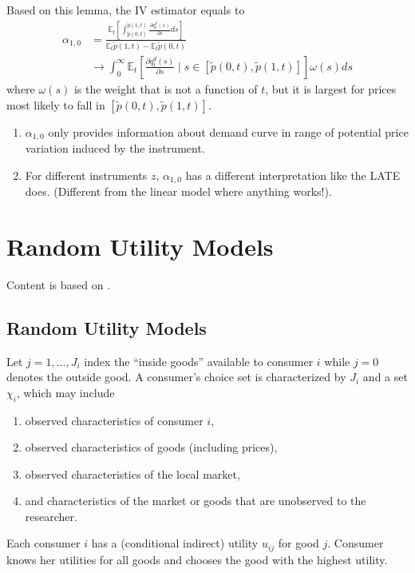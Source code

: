 \documentclass[11pt]{elegantbook}
\begin{document}
\begin{theorem}
    Based on this lemma, the IV estimator equals to
    \begin{equation}
        \begin{aligned}
            \alpha_{1,0}&=\frac{\mathbb{E}_t\left[\int_{\tilde{p}(0,t)}^{\tilde{p}(1,t)}\frac{\partial q^d_t(s)}{\partial s}ds\right]}{\mathbb{E}_t\tilde{p}(1,t)-\mathbb{E}_t\tilde{p}(0,t)}\\
            &\rightarrow \int_0^\infty \mathbb{E}_t\left[\frac{\partial q^d_t(s)}{\partial s}\mid s\in[\tilde{p}(0,t),\tilde{p}(1,t)]\right]\omega(s)ds
        \end{aligned}
        \nonumber
    \end{equation}
    where $\omega(s)$ is the weight that is not a function of $t$, but it is largest for prices most likely to fall in $[\tilde{p}(0,t),\tilde{p}(1,t)]$.
\end{theorem}
\begin{note}
    \begin{enumerate}
        \item $\alpha_{1,0}$ only provides information about demand curve in range of potential price variation induced by the instrument.
        \item  For different instruments $z$, $\alpha_{1,0}$ has a different interpretation like the LATE does. (Different from the linear model where anything works!).
    \end{enumerate}
\end{note}




















\chapter{Random Utility Models}
Content is based on \cite{berry2021foundations}.
\section{Random Utility Models}
Let $j=1,...,J_i$ index the ``inside goods'' available to consumer $i$ while $j=0$ denotes the outside good. A consumer's choice set is characterized by $J_i$ and a set $\chi_i$, which may include
\begin{enumerate}[$\circ$]
    \item observed characteristics of consumer $i$,
    \item observed characteristics of goods (including prices),
    \item observed characteristics of the local market,
    \item and characteristics of the market or goods that are unobserved to the researcher.
\end{enumerate}
Each consumer $i$ has a (conditional indirect) utility $u_{ij}$ for good $j$. Consumer knows her utilities for all goods and chooses the good with the highest utility.
\end{document}
